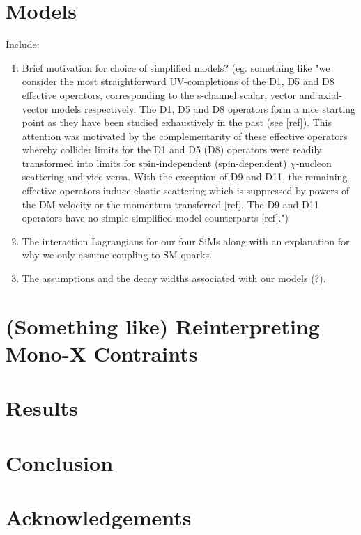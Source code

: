 \documentclass[a4paper,11pt]{article}
\begin{document}
\section{Models} 
\label{sec:sec2}
\begin{flushleft}
Include:
\begin{enumerate}
\item Brief motivation for choice of simplified models? (eg. something like "we consider the most straightforward UV-completions of the D1, D5 and D8 effective operators, corresponding to the s-channel scalar, vector and axial-vector models respectively. The D1, D5 and D8 operators form a nice starting point as they have been studied exhaustively in the past (see [ref]). This attention was motivated by the complementarity of these effective operators whereby collider limits
for the D1 and D5 (D8) operators were readily transformed into limits for spin-independent (spin-dependent) $\chi$-nucleon scattering and vice versa. With the exception of D9 and D11, the remaining effective operators induce elastic scattering which is suppressed by powers of the DM velocity or the momentum transferred [ref]. The D9 and D11 operators have no simple simplified model counterparts [ref].")
\item The interaction Lagrangians for our four SiMs along with an explanation for why we only assume coupling to SM quarks. 
\item The assumptions and the decay widths associated with our models (?).
\end{enumerate}
\end{flushleft}

\section{(Something like) Reinterpreting Mono-X Contraints} 
\label{sec:sec3}

\section{Results} 
\label{sec:sec4}

\section{Conclusion} 
\label{sec:sec5}

\section{Acknowledgements} 
\label{sec:sec6}
\end{document}
